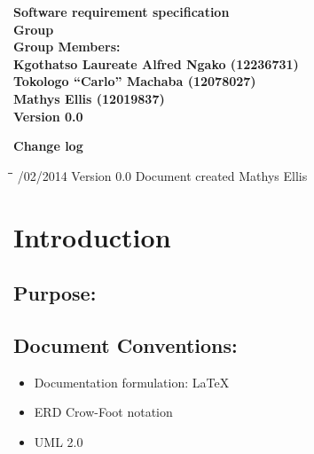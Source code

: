 \documentclass[12pt]{article}
\newcommand{\Title}{Software requirement specification} %
\begin{document}
	\vspace{4em}
	
	\begin{center}%
	
	  \LARGE \bf \Title \\[4em]
	  \LARGE {\bf Group }\\[1em]
	  \LARGE {\bf Group Members:}\\[2em]
	  \large
	     Kgothatso Laureate Alfred Ngako	(12236731) \\[1em]
	     Tokologo “Carlo” Machaba			(12078027) \\[1em]
	     Mathys Ellis						(12019837) \\[8em]
	     {\bf Version 0.0}
	    
	\end{center}%
	
	\newpage
		{\LARGE \bf Change log}\\[2em]
		
		\begin{tabbing}
			\hspace*{2.5cm}\=\hspace*{2.5cm}\=\hspace*{8cm}\=\hspace*{3cm} /02/2014 \> Version 0.0 \> Document created \> Mathys Ellis \\

			
		\end{tabbing}
	
	\newpage
		\tableofcontents	
		
	\newpage
	\section{Introduction} %
	
	\vspace{0.2in}

		\subsection{Purpose:}
		\vspace{0.2in}
		 
	
		\vspace{0.2in}
	
		\subsection{Document Conventions:}
		\vspace{0.1in}
		\begin{itemize}
			\item Documentation formulation: LaTeX
			\item ERD Crow-Foot notation
			\item UML 2.0
		\end{itemize}
	
\end{document}
